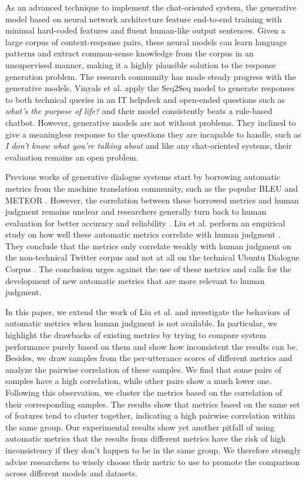 \documentclass[runningheads]{llncs}
\begin{document}
    As an advanced technique to implement the chat-oriented system, the generative model based on neural network architecture feature end-to-end training with minimal hard-coded features and fluent human-like output sentences. Given a large corpus of context-response pairs, these neural models can learn language patterns and extract common-sense knowledge from the corpus in an unsupervised manner, making it a highly plausible solution to the response generation problem. The research community has made steady progress with the generative models. Vinyals et al. \cite{GoogleChatbot} apply the Seq2Seq model \cite{Seq2Seq} to generate responses to both technical queries in an IT helpdesk and open-ended questions such as \textit{what's the purpose of life?} and their model consistently beats a rule-based chatbot. However, generative models are not without problems. They inclined to give a meaningless response to the questions they are incapable to handle, such as \textit{I don't know what you're talking about} and like any chat-oriented systems, their evaluation remains an open problem.

    Previous works of generative dialogue systems start by borrowing automatic metrics from the machine translation community, such as the popular BLEU \cite{BLEU} and METEOR \cite{METEOR}. However, the correlation between these borrowed metrics and human judgment remains unclear and researchers generally turn back to human evaluation for better accuracy and reliability \cite{Shang,DCGM,VHRED}. Liu et al. perform an empirical study on how well these automatic metrics correlate with human judgment \cite{HowNot}. They conclude that the metrics only correlate weakly with human judgment on the non-technical Twitter corpus and not at all on the technical Ubuntu Dialogue Corpus \cite{ubuntu_corpus}. The conclusion urges against the use of these metrics and calls for the development of new automatic metrics that are more relevant to human judgment.

    In this paper, we extend the work of Liu et al. and investigate the behaviors of automatic metrics when human judgment is not available. In particular, we highlight the drawbacks of existing metrics by trying to compare system performance purely based on them and show how inconsistent the results can be. Besides, we draw samples from the per-utterance scores of different metrics and analyze the pairwise correlation of these samples. We find that some pairs of samples have a high correlation, while other pairs show a much lower one. Following this observation, we cluster the metrics based on the correlation of their corresponding samples. The results show that metrics based on the same set of features tend to cluster together, indicating a high pairwise correlation within the same group. Our experimental results show yet another pitfall of using automatic metrics that the results from different metrics have the risk of high inconsistency if they don't happen to be in the same group. We therefore strongly advise researchers to wisely choose their metric to use to promote the comparison across different models and datasets.
\end{document}
